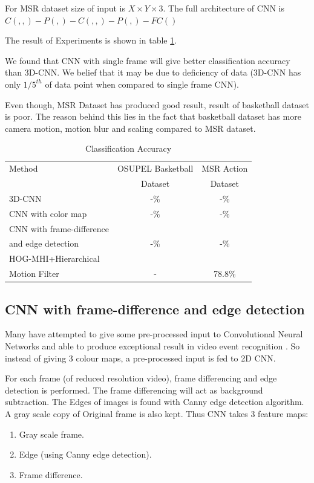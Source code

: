 For MSR dataset size of input is $X \times Y \times 3$. The full architecture of CNN is $C(, , )-P(, )-C(, , )-P(, )-FC()$

The result of Experiments is shown in table \ref{table:cnn_res}.

We found that CNN with single frame will give better classification accuracy than 3D-CNN. We belief that it may be due to deficiency of data (3D-CNN has only $1/5^{th}$ of data point when compared to single frame CNN).

Even though, MSR Dataset has produced good result, result of basketball dataset is poor. The reason behind this lies in the fact that basketball dataset has more camera motion, motion blur and scaling compared to MSR dataset.

\begin{table}[h]
\centering
\begin{tabular}{|l|c|c|}
\hline
Method & OSUPEL Basketball& MSR Action\\
       & Dataset          &Dataset \\
\hline
\hline
3D-CNN  &-\%   &-\% \\
\hline
CNN with color map  &-\%   &-\% \\
\hline
CNN with frame-difference &&\\
and edge detection &-\%   &-\% \\
\hline
HOG-MHI+Hierarchical &&\\
Motion Filter  & -  &78.8\% \\
\hline  
\end{tabular}
\caption[Classification Accuracy]{Classification Accuracy}
\label{table:cnn_res}
\end{table} 

\subsection{CNN with frame-difference and edge detection}

Many have attempted to give some pre-processed input to Convolutional Neural Networks and able to produce exceptional result in video event recognition \citep{ji20133d}. So instead of giving 3 colour maps, a pre-processed input is fed to 2D CNN.

For each frame (of reduced resolution video), frame differencing and edge detection is performed. The frame differencing will act as background subtraction. The Edges of images is found with Canny edge detection algorithm. A gray scale copy of Original frame is also kept. Thus CNN takes 3 feature maps:
\begin{enumerate}
\item Gray scale frame.
\item Edge (using Canny edge detection).
\item Frame difference.
\end{enumerate}

